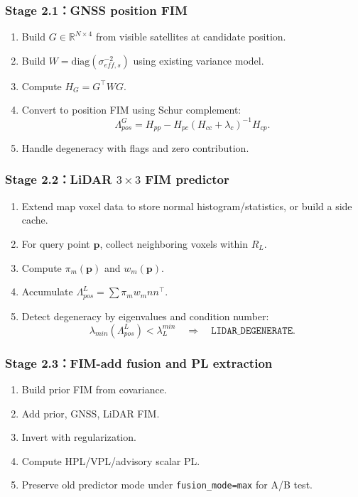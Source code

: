 \documentclass[11pt,a4paper]{article}
\newcommand{\Lam}{\Lambda}
\newcommand{\pvec}{\mathbf{p}}
\newcommand{\diag}{\mathrm{diag}}
\begin{document}
\subsubsection{Stage 2.1：GNSS position FIM}
\begin{enumerate}
\item Build $G\in\mathbb{R}^{N\times4}$ from visible satellites at candidate position.
\item Build $W=\diag(\sigma^{-2}_{eff,s})$ using existing variance model.
\item Compute $H_G=G^\top W G$.
\item Convert to position FIM using Schur complement:
  \[
    \Lam^G_{pos}=H_{pp}-H_{pc}(H_{cc}+\lambda_c)^{-1}H_{cp}.
  \]
\item Handle degeneracy with flags and zero contribution.
\end{enumerate}

\subsubsection{Stage 2.2：LiDAR \texorpdfstring{$3\times3$}{3x3} FIM predictor}
\begin{enumerate}
\item Extend map voxel data to store normal histogram/statistics, or build a side cache.
\item For query point $\pvec$, collect neighboring voxels within $R_L$.
\item Compute $\pi_m(\pvec)$ and $w_m(\pvec)$.
\item Accumulate $\Lam^L_{pos}=\sum \pi_m w_m nn^\top$.
\item Detect degeneracy by eigenvalues and condition number:
  \[
    \lambda_{min}(\Lam^L_{pos}) < \lambda_L^{min}
    \quad \Rightarrow \quad
    \texttt{LIDAR\_DEGENERATE}.
  \]
\end{enumerate}

\subsubsection{Stage 2.3：FIM-add fusion and PL extraction}
\begin{enumerate}
\item Build prior FIM from covariance.
\item Add prior, GNSS, LiDAR FIM.
\item Invert with regularization.
\item Compute HPL/VPL/advisory scalar PL.
\item Preserve old predictor mode under \texttt{fusion\_mode=max} for A/B test.
\end{enumerate}
\end{document}
